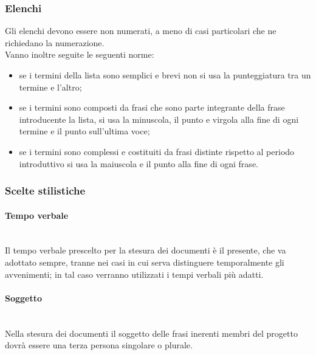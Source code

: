 \subsubsection{Elenchi}
Gli elenchi devono essere non numerati, a meno di casi particolari che ne richiedano la numerazione.\\
Vanno inoltre seguite le seguenti norme:
\begin{itemize}
	\item se i termini della lista sono semplici e brevi non si usa la punteggiatura tra un termine e l'altro;
	\item se i termini sono composti da frasi che sono parte integrante della frase introducente la lista, si usa la minuscola, il punto e virgola alla fine di ogni termine e il punto sull'ultima voce;
	\item se i termini sono complessi e costituiti da frasi distinte rispetto al periodo introduttivo si usa la maiuscola e il punto alla fine di ogni frase.
\end{itemize}

\subsubsection{Scelte stilistiche}
\paragraph{Tempo verbale} \mbox{} \\
Il tempo verbale prescelto per la stesura dei documenti è il presente, che va adottato sempre, tranne nei casi in cui serva distinguere temporalmente gli avvenimenti; in tal caso verranno utilizzati i tempi verbali più adatti.

\paragraph{Soggetto} \mbox{} \\
Nella stesura dei documenti il soggetto delle frasi inerenti membri del progetto dovrà essere una terza persona singolare o plurale.

